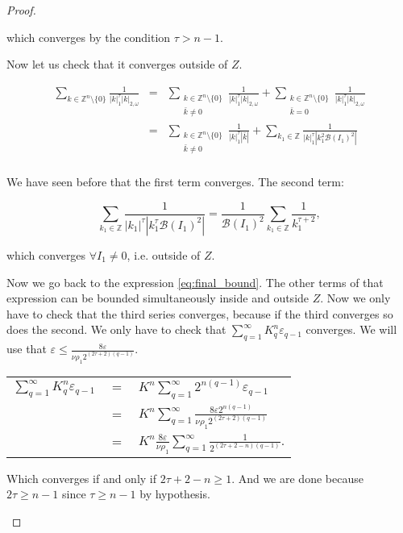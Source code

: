 \begin{proof}
\begin{enumerate}
which converges by the condition $\tau > n-1$.

Now let us check that it converges outside of $Z$.

$$
\begin{array}{rcl}
\sum_{k\in \mathbb{Z}^n\setminus \{0\}}\frac{1}{|k|_1^\tau |k|_{2,\omega}} & = & \sum_{\substack{k \in \mathbb{Z}^n \setminus \{0\} \\ \bar k \neq 0}} \frac{1}{|k|_1^\tau |k|_{2,\omega}} + \sum_{\substack{k \in \mathbb{Z}^n \setminus \{0\} \\ \bar k = 0}} \frac{1}{|k|_1^\tau |k|_{2,\omega}}\\
& = & \sum_{\substack{k \in \mathbb{Z}^n \setminus \{0\} \\ \bar k \neq 0}} \frac{1}{|k|_1^\tau |\bar k|} + \sum_{k_1 \in \mathbb{Z}} \frac{1}{|k|_1^\tau |k_1^2\mathcal{B}(I_1)^2|}\\
\end{array}
$$


We have seen before that the first term converges.
The second term:

$$\sum_{k_1 \in \mathbb{Z}}\frac{1}{|k_1|^\tau|k_1^\tau \mathcal{B}(I_1)^2|} = \frac{1}{\mathcal{B}(I_1)^2}\sum_{k_1 \in \mathbb{Z}}\frac{1}{k_1^{\tau+2}},$$

which converges $\forall I_1 \neq 0$, i.e. outside of $Z$.

Now we go back to the expression \ref{eq:final_bound}.
The other terms of that expression can be bounded simultaneously inside and outside $Z$.
Now we only have to check that the third series converges, because if the third converges so does the second.
We only have to check that $\sum_{q=1}^\infty K_q^n \varepsilon_{q-1}$ converges. We will use that $\varepsilon \leq \frac{8 \varepsilon}{\nu \rho_1 2^{(2\tau+2)(q-1)}}$.

\begin{longtable}{rcl}
$\sum_{q=1}^\infty K_q^n \varepsilon_{q-1}$ & $=$ & $K^n \sum_{q=1}^\infty 2^{n(q-1)} \varepsilon_{q-1}$ \\
 & $=$ & $K^n \sum_{q=1}^\infty \frac{8\varepsilon 2^{n(q-1)}}{\nu \rho_1 2^{(2\tau+2)(q-1)}}$ \\
  & $=$ & $K^n \frac{8\varepsilon}{\nu \rho_1} \sum_{q=1}^\infty \frac{1}{2^{(2\tau+2-n)(q-1)}}.$ \\
\end{longtable}
Which converges if and only if $2\tau+2-n \geq 1$. And we are done because $2\tau \geq n-1$ since $\tau  \geq n-1$ by hypothesis.


\end{enumerate}
\end{proof}
